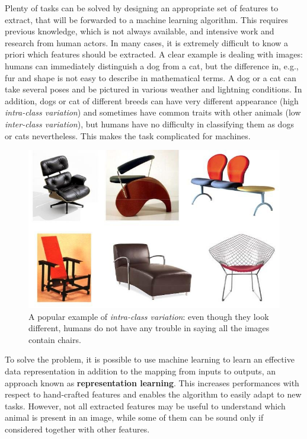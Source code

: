 \documentclass[%
    corpo=12pt,
    twoside,
    stile=classica,   
    tipotesi=magistrale,
    evenboxes,
    english,
	numerazioneromana,
]{toptesi}
\begin{document}
\medskip
Plenty of tasks can be solved by designing an appropriate set of features to extract, that will be forwarded to a machine learning algorithm. This requires previous knowledge, which is not always available, and intensive work and research from human actors. In many cases, it is extremely difficult to know a priori which features should be extracted. A clear example is dealing with images: humans can immediately distinguish a dog from a cat, but the difference in, e.g., fur and shape is not easy to describe in mathematical terms. A dog or a cat can take several poses and be pictured in various weather and lightning conditions. In addition, dogs or cat of different breeds can have very different appearance (high \textit{intra-class variation}) and sometimes have common traits with other animals (low \textit{inter-class variation}), but humans have no difficulty in classifying them as dogs or cats nevertheless. This makes the task complicated for machines.

\begin{figure}[ht]
	\centering
	\includegraphics[width=.75\linewidth]{imgs/chairs.png}
	\caption{A popular example of \textit{intra-class variation}: even though they look different, humans do not have any trouble in saying all the images contain chairs.}
	\label{fig:intraclass}
\end{figure}

To solve the problem, it is possible to use machine learning to learn an effective data representation in addition to the mapping from inputs to outputs, an approach known as \textbf{representation learning}. This increases performances with respect to hand-crafted features and enables the algorithm to easily adapt to new tasks. However, not all extracted features may be useful to understand which animal is present in an image, while some of them can be sound only if considered together with other features.
\end{document}
